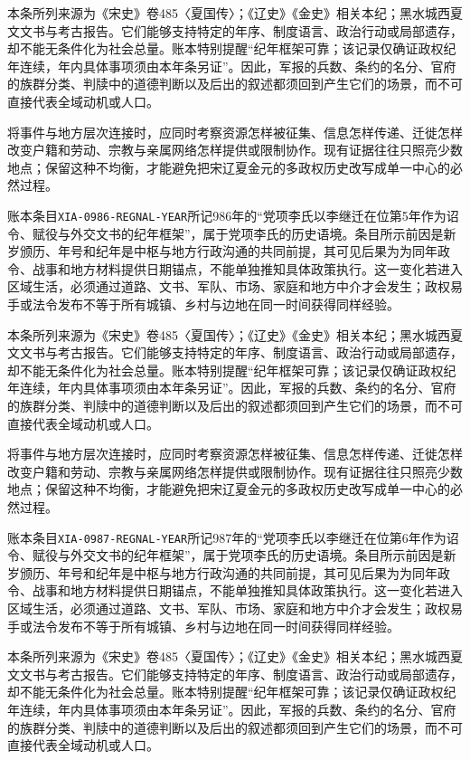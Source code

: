 本条所列来源为《宋史》卷485〈夏国传〉；《辽史》《金史》相关本纪；黑水城西夏文文书与考古报告。它们能够支持特定的年序、制度语言、政治行动或局部遗存，却不能无条件化为社会总量。账本特别提醒“纪年框架可靠；该记录仅确证政权纪年连续，年内具体事项须由本年条另证”。因此，军报的兵数、条约的名分、官府的族群分类、判牍中的道德判断以及后出的叙述都须回到产生它们的场景，而不可直接代表全域动机或人口。

将事件与地方层次连接时，应同时考察资源怎样被征集、信息怎样传递、迁徙怎样改变户籍和劳动、宗教与亲属网络怎样提供或限制协作。现有证据往往只照亮少数地点；保留这种不均衡，才能避免把宋辽夏金元的多政权历史改写成单一中心的必然过程。

账本条目\texttt{XIA-0986-REGNAL-YEAR}所记986年的“党项李氏以李继迁在位第5年作为诏令、赋役与外交文书的纪年框架”，属于党项李氏的历史语境。条目所示前因是新岁颁历、年号和纪年是中枢与地方行政沟通的共同前提，其可见后果为为同年政令、战事和地方材料提供日期锚点，不能单独推知具体政策执行。这一变化若进入区域生活，必须通过道路、文书、军队、市场、家庭和地方中介才会发生；政权易手或法令发布不等于所有城镇、乡村与边地在同一时间获得同样经验。

本条所列来源为《宋史》卷485〈夏国传〉；《辽史》《金史》相关本纪；黑水城西夏文文书与考古报告。它们能够支持特定的年序、制度语言、政治行动或局部遗存，却不能无条件化为社会总量。账本特别提醒“纪年框架可靠；该记录仅确证政权纪年连续，年内具体事项须由本年条另证”。因此，军报的兵数、条约的名分、官府的族群分类、判牍中的道德判断以及后出的叙述都须回到产生它们的场景，而不可直接代表全域动机或人口。

将事件与地方层次连接时，应同时考察资源怎样被征集、信息怎样传递、迁徙怎样改变户籍和劳动、宗教与亲属网络怎样提供或限制协作。现有证据往往只照亮少数地点；保留这种不均衡，才能避免把宋辽夏金元的多政权历史改写成单一中心的必然过程。

账本条目\texttt{XIA-0987-REGNAL-YEAR}所记987年的“党项李氏以李继迁在位第6年作为诏令、赋役与外交文书的纪年框架”，属于党项李氏的历史语境。条目所示前因是新岁颁历、年号和纪年是中枢与地方行政沟通的共同前提，其可见后果为为同年政令、战事和地方材料提供日期锚点，不能单独推知具体政策执行。这一变化若进入区域生活，必须通过道路、文书、军队、市场、家庭和地方中介才会发生；政权易手或法令发布不等于所有城镇、乡村与边地在同一时间获得同样经验。

本条所列来源为《宋史》卷485〈夏国传〉；《辽史》《金史》相关本纪；黑水城西夏文文书与考古报告。它们能够支持特定的年序、制度语言、政治行动或局部遗存，却不能无条件化为社会总量。账本特别提醒“纪年框架可靠；该记录仅确证政权纪年连续，年内具体事项须由本年条另证”。因此，军报的兵数、条约的名分、官府的族群分类、判牍中的道德判断以及后出的叙述都须回到产生它们的场景，而不可直接代表全域动机或人口。

